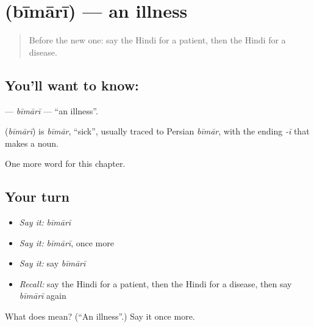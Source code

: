 \section[\texorpdfstring{\hi{बीमारी} (bīmārī)}{बीमारी (bīmārī)}]{ (bīmārī) — an illness}

\label{lesson:HI-C273-bimari}



\begin{quote}
Before the new one: say the Hindi for a patient, then the Hindi for a disease.
\end{quote}

\subsection*{You'll want to know: }
\textbf{} — \emph{bīmārī} — \textquotedblleft{}an illness\textquotedblright{}.

\begin{cousinweb}
\textbf{} (\emph{bīmārī}) is \emph{bīmār}, \textquotedblleft{}sick\textquotedblright{}, usually traced to Persian \emph{bīmār}, with the ending \emph{-ī} that makes a noun.
\end{cousinweb}

\begin{grammarlens}[title={What you've built}]
One more word for this chapter.
\end{grammarlens}

\subsection*{Your turn}
\begin{itemize}
\raggedright
  \item \emph{Say it:} \emph{bīmārī}
  \item \emph{Say it:} \emph{bīmārī}, once more
  \item \emph{Say it:} say \emph{bīmārī}
  \item \emph{Recall:} say the Hindi for a patient, then the Hindi for a disease, then say \emph{bīmārī} again
\end{itemize}

\begin{tcolorbox}[breakable,colback=teal!4,colframe=teal!35!black,title={Before you move on}]
What does  mean? (\textquotedblleft{}An illness\textquotedblright{}.) Say it once more.
\end{tcolorbox}
